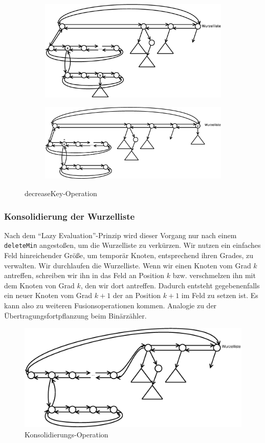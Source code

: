 \begin{figure}[H]
\centering
\begin{subfigure}[h]{0.45\linewidth}
	\includegraphics[width=\linewidth]{21/Grafik/decreaseKey1}
\end{subfigure}
\begin{subfigure}[h]{0.45\linewidth}
	\includegraphics[width=\linewidth]{21/Grafik/decreaseKey2}
\end{subfigure}
\caption{decreaseKey-Operation}
\end{figure}

\subsubsection{Konsolidierung der Wurzelliste}
Nach dem "`Lazy Evaluation"'-Prinzip wird dieser Vorgang nur nach einem \texttt{deleteMin} angestoßen, um die Wurzelliste zu verkürzen. Wir nutzen ein einfaches Feld hinreichender Größe, um temporär Knoten, entsprechend ihren Grades, zu verwalten. Wir durchlaufen die Wurzelliste. Wenn wir einen Knoten vom Grad $k$ antreffen, schreiben wir ihn in das Feld an Position $k$ bzw. verschmelzen ihn mit dem Knoten von Grad $k$, den wir dort antreffen. Dadurch entsteht gegebenenfalls ein neuer Knoten vom Grad $k+1$ der an Position $k+1$ im Feld zu setzen ist. Es kann also zu weiteren Fusionsoperationen kommen. Analogie zu der Übertragungsfortpflanzung beim Binärzähler.

\begin{figure}[H]
	\centering
	\includegraphics[width=0.65\linewidth]{21/Grafik/insert}
	\caption{Konsolidierungs-Operation}
\end{figure}

